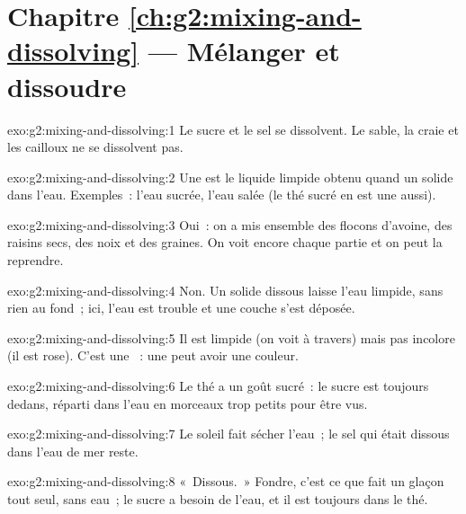 \section*{Chapitre \ref{ch:g2:mixing-and-dissolving} --- Mélanger et dissoudre}

\begin{solution}{exo:g2:mixing-and-dissolving:1}
Le sucre et le sel se dissolvent. Le sable, la craie et les cailloux ne
se dissolvent pas.
\end{solution}

\begin{solution}{exo:g2:mixing-and-dissolving:2}
Une  est le liquide limpide obtenu quand un solide 
dans l'eau. Exemples~: l'eau sucrée, l'eau salée (le thé sucré en est
une aussi).
\end{solution}

\begin{solution}{exo:g2:mixing-and-dissolving:3}
Oui~: on a mis ensemble des flocons d'avoine, des raisins secs, des noix
et des graines. On voit encore chaque partie et on peut la reprendre.
\end{solution}

\begin{solution}{exo:g2:mixing-and-dissolving:4}
Non. Un solide dissous laisse l'eau limpide, sans rien au fond~; ici,
l'eau est trouble et une couche s'est déposée.
\end{solution}

\begin{solution}{exo:g2:mixing-and-dissolving:5}
Il est limpide (on voit à travers) mais pas incolore (il est rose).
C'est une ~: une  peut avoir une couleur.
\end{solution}

\begin{solution}{exo:g2:mixing-and-dissolving:6}
Le thé a un goût sucré~: le sucre est toujours dedans, réparti dans
l'eau en morceaux trop petits pour être vus.
\end{solution}

\begin{solution}{exo:g2:mixing-and-dissolving:7}
Le soleil fait sécher l'eau~; le sel qui était dissous dans l'eau de mer
reste.
\end{solution}

\begin{solution}{exo:g2:mixing-and-dissolving:8}
«~Dissous.~» Fondre, c'est ce que fait un glaçon tout seul, sans eau~;
le sucre a besoin de l'eau, et il est toujours dans le thé.
\end{solution}

